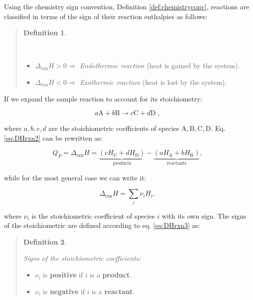 \documentclass[
  9pt,
]{extbook}
\providecommand{\tightlist}{%
  \setlength{\itemsep}{0pt}\setlength{\parskip}{0pt}}
\theoremstyle{definition}
\newtheorem{definition}{Definition}[chapter]
\theoremstyle{definition}
\theoremstyle{definition}
\theoremstyle{definition}
\theoremstyle{remark}
\begin{document}
Using the chemistry sign convention, Definition \ref{def:chemistryconv}, reactions are classified in terms of the sign of their reaction enthalpies as follows:

\begin{quote}
\begin{definition}
\protect\hypertarget{def:exoendo}{}\label{def:exoendo}

\(\;\)

\begin{itemize}
\tightlist
\item
  \(\Delta_{\text{rxn}} H > 0 \Rightarrow\) \emph{Endothermic reaction} (heat is gained by the system).
\item
  \(\Delta_{\text{rxn}} H < 0 \Rightarrow\) \emph{Exothermic reaction} (heat is lost by the system).
\end{itemize}

\end{definition}
\end{quote}

If we expand the sample reaction to account for its stoichiometry:

\[ a\mathrm{A} + b\mathrm{B} \rightarrow c\mathrm{C} + d\mathrm{D}\; , \]

where \(a,b,c,d\) are the stoichiometric coefficients of species \(\mathrm{A,B,C,D}\). Eq. \eqref{eq:DHrxn2} can be rewritten as:

\begin{equation}
  Q_P = \Delta_{\text{rxn}} H = \underbrace{\left( cH_{\mathrm{C}}+dH_{\mathrm{D}} \right) }_{\text{products}} - \underbrace{ \left( aH_{\mathrm{A}}+bH_{\mathrm{B}} \right)}_{\text{reactants}},
  \label{eq:DHrxn3}
\end{equation}

while for the most general case we can write it:

\begin{equation}
  \Delta_{\text{rxn}} H = \sum_i \nu_i H_i,
  \label{eq:DHrxn4}
\end{equation}

where \(\nu_i\) is the stoichiometric coefficient of species \(i\) with its own sign. The signs of the stoichiometric are defined according to eq. \eqref{eq:DHrxn3} as:

\begin{quote}
\begin{definition}
\protect\hypertarget{def:nui}{}\label{def:nui}

\emph{Signs of the stoichiometric coefficients:}

\begin{itemize}
\tightlist
\item
  \(\nu_i\) is \textbf{positive} if \(i\) is a \textbf{product}.
\item
  \(\nu_i\) is \textbf{negative} if \(i\) is a \textbf{reactant}.
\end{itemize}

\end{definition}
\end{quote}
\end{document}
